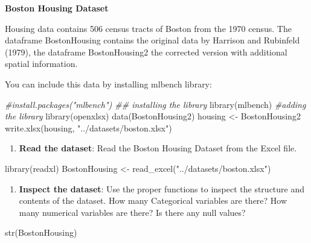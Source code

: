 \documentclass[
]{book}
\newenvironment{Shaded}{\begin{snugshade}}{\end{snugshade}}
\newcommand{\CommentTok}[1]{\textcolor[rgb]{0.56,0.35,0.01}{\textit{#1}}}
\newcommand{\FunctionTok}[1]{\textcolor[rgb]{0.00,0.00,0.00}{#1}}
\newcommand{\NormalTok}[1]{#1}
\newcommand{\OtherTok}[1]{\textcolor[rgb]{0.56,0.35,0.01}{#1}}
\newcommand{\StringTok}[1]{\textcolor[rgb]{0.31,0.60,0.02}{#1}}
\providecommand{\tightlist}{%
  \setlength{\itemsep}{0pt}\setlength{\parskip}{0pt}}
\begin{document}
\textbf{Boston Housing Dataset}

Housing data contains 506 census tracts of Boston from the 1970 census. The dataframe BostonHousing contains the original data by Harrison and Rubinfeld (1979), the dataframe BostonHousing2 the corrected version with additional spatial information.

You can include this data by installing mlbench library:

\begin{Shaded}
\begin{Highlighting}[]
\CommentTok{\#install.packages("mlbench") \#\# installing the library}
\FunctionTok{library}\NormalTok{(mlbench) }\CommentTok{\#adding the library}
\FunctionTok{library}\NormalTok{(openxlsx)}
\FunctionTok{data}\NormalTok{(BostonHousing2)}
\NormalTok{housing }\OtherTok{\textless{}{-}}\NormalTok{ BostonHousing2}
\FunctionTok{write.xlsx}\NormalTok{(housing, }\StringTok{"../datasets/boston.xlsx"}\NormalTok{)}
\end{Highlighting}
\end{Shaded}

\begin{enumerate}
\def\labelenumi{\arabic{enumi}.}
\tightlist
\item
  \textbf{Read the dataset}: Read the Boston Housing Dataset from the Excel file.
\end{enumerate}

\begin{Shaded}
\begin{Highlighting}[]
\FunctionTok{library}\NormalTok{(readxl)}
\NormalTok{BostonHousing }\OtherTok{\textless{}{-}} \FunctionTok{read\_excel}\NormalTok{(}\StringTok{"../datasets/boston.xlsx"}\NormalTok{)}
\end{Highlighting}
\end{Shaded}

\begin{enumerate}
\def\labelenumi{\arabic{enumi}.}
\setcounter{enumi}{1}
\tightlist
\item
  \textbf{Inspect the dataset}: Use the proper functions to inspect the structure and contents of the dataset. How many Categorical variables are there? How many numerical variables are there? Is there any null values?
\end{enumerate}

\begin{Shaded}
\begin{Highlighting}[]
\FunctionTok{str}\NormalTok{(BostonHousing)}
\end{Highlighting}
\end{Shaded}
\end{document}
